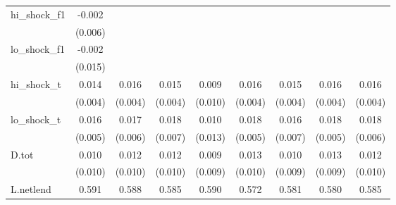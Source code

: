 {\begin{tabular}{l*{8}{c}}
\addlinespace
hi\_shock\_f1 &      -0.002         &                     &                     &                     &                     &                     &                     &                     \\
            &     (0.006)         &                     &                     &                     &                     &                     &                     &                     \\
\addlinespace
lo\_shock\_f1 &      -0.002         &                     &                     &                     &                     &                     &                     &                     \\
            &     (0.015)         &                     &                     &                     &                     &                     &                     &                     \\
\addlinespace
hi\_shock\_t  &       0.014\sym{***}&       0.016\sym{***}&       0.015\sym{***}&       0.009         &       0.016\sym{***}&       0.015\sym{***}&       0.016\sym{***}&       0.016\sym{***}\\
            &     (0.004)         &     (0.004)         &     (0.004)         &     (0.010)         &     (0.004)         &     (0.004)         &     (0.004)         &     (0.004)         \\
\addlinespace
lo\_shock\_t  &       0.016\sym{***}&       0.017\sym{***}&       0.018\sym{**} &       0.010         &       0.018\sym{***}&       0.016\sym{**} &       0.018\sym{***}&       0.018\sym{***}\\
            &     (0.005)         &     (0.006)         &     (0.007)         &     (0.013)         &     (0.005)         &     (0.007)         &     (0.005)         &     (0.006)         \\
\addlinespace
D.tot       &       0.010         &       0.012         &       0.012         &       0.009         &       0.013         &       0.010         &       0.013         &       0.012         \\
            &     (0.010)         &     (0.010)         &     (0.010)         &     (0.009)         &     (0.010)         &     (0.009)         &     (0.009)         &     (0.010)         \\
\addlinespace
L.netlend   &       0.591\sym{***}&       0.588\sym{***}&       0.585\sym{***}&       0.590\sym{***}&       0.572\sym{***}&       0.581\sym{***}&       0.580\sym{***}&       0.585\sym{***}\\

\end{tabular}}
